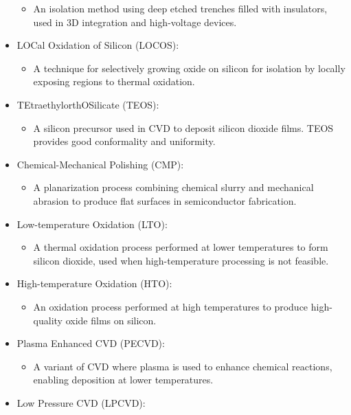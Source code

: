 \documentclass[
]{article}
\providecommand{\tightlist}{%
  \setlength{\itemsep}{0pt}\setlength{\parskip}{0pt}}
\begin{document}
\begin{itemize}
  \begin{itemize}
  \tightlist
  \item
    An isolation method using deep etched trenches filled with
    insulators, used in 3D integration and high-voltage devices.
  \end{itemize}
\item
  LOCal Oxidation of Silicon (LOCOS):

  \begin{itemize}
  \tightlist
  \item
    A technique for selectively growing oxide on silicon for isolation
    by locally exposing regions to thermal oxidation.
  \end{itemize}
\item
  TEtraethylorthOSilicate (TEOS):

  \begin{itemize}
  \tightlist
  \item
    A silicon precursor used in CVD to deposit silicon dioxide films.
    TEOS provides good conformality and uniformity.
  \end{itemize}
\item
  Chemical-Mechanical Polishing (CMP):

  \begin{itemize}
  \tightlist
  \item
    A planarization process combining chemical slurry and mechanical
    abrasion to produce flat surfaces in semiconductor fabrication.
  \end{itemize}
\item
  Low-temperature Oxidation (LTO):

  \begin{itemize}
  \tightlist
  \item
    A thermal oxidation process performed at lower temperatures to form
    silicon dioxide, used when high-temperature processing is not
    feasible.
  \end{itemize}
\item
  High-temperature Oxidation (HTO):

  \begin{itemize}
  \tightlist
  \item
    An oxidation process performed at high temperatures to produce
    high-quality oxide films on silicon.
  \end{itemize}
\item
  Plasma Enhanced CVD (PECVD):

  \begin{itemize}
  \tightlist
  \item
    A variant of CVD where plasma is used to enhance chemical reactions,
    enabling deposition at lower temperatures.
  \end{itemize}
\item
  Low Pressure CVD (LPCVD):


\end{itemize}
\end{document}
